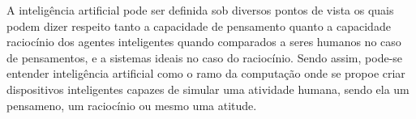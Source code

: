 A inteligência artificial pode ser definida sob diversos pontos de vista os quais podem dizer respeito tanto a capacidade de pensamento quanto a capacidade raciocínio dos agentes inteligentes quando comparados a seres humanos no caso de pensamentos, e a sistemas ideais no caso do raciocínio. \cite{norvig2014inteligencia}
Sendo assim, pode-se entender inteligência artificial como o ramo da computação onde se propoe criar dispositivos inteligentes capazes de simular uma atividade humana, sendo ela um pensameno, um raciocínio ou mesmo uma atitude.
